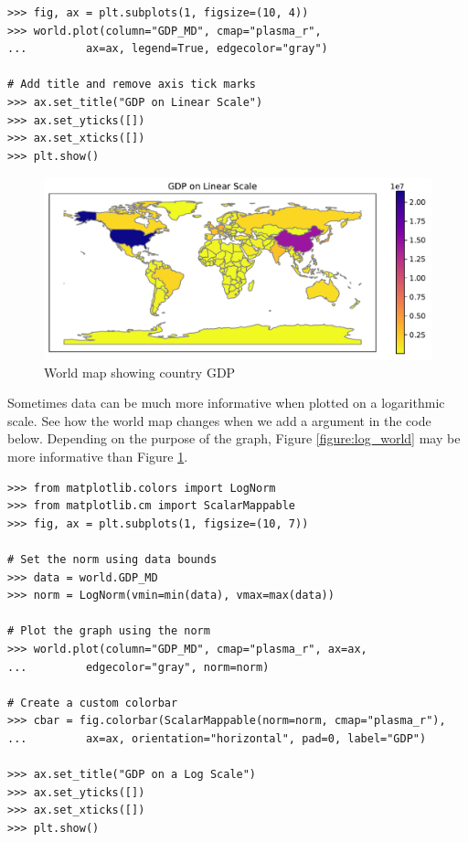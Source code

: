 \begin{lstlisting}
>>> fig, ax = plt.subplots(1, figsize=(10, 4))
>>> world.plot(column="GDP_MD", cmap="plasma_r",
...			ax=ax, legend=True, edgecolor="gray")

# Add title and remove axis tick marks
>>> ax.set_title("GDP on Linear Scale")
>>> ax.set_yticks([])
>>> ax.set_xticks([])
>>> plt.show()
\end{lstlisting}

\begin{figure}[H]
\begin{center}
\includegraphics[scale=.7]{figures/world_linear.pdf}
\end{center}
\caption{World map showing country GDP}
\label{figure:linear_world}
\end{figure}

Sometimes data can be much more informative when plotted on a logarithmic scale.
See how the world map changes when we add a  argument in the code below.
Depending on the purpose of the graph, Figure \ref{figure:log_world} may be more informative than Figure \ref{figure:linear_world}.

\begin{lstlisting}
>>> from matplotlib.colors import LogNorm
>>> from matplotlib.cm import ScalarMappable
>>> fig, ax = plt.subplots(1, figsize=(10, 7))

# Set the norm using data bounds
>>> data = world.GDP_MD
>>> norm = LogNorm(vmin=min(data), vmax=max(data))

# Plot the graph using the norm
>>> world.plot(column="GDP_MD", cmap="plasma_r", ax=ax,
...			edgecolor="gray", norm=norm)

# Create a custom colorbar
>>> cbar = fig.colorbar(ScalarMappable(norm=norm, cmap="plasma_r"),
...			ax=ax, orientation="horizontal", pad=0, label="GDP")

>>> ax.set_title("GDP on a Log Scale")
>>> ax.set_yticks([])
>>> ax.set_xticks([])
>>> plt.show()
\end{lstlisting}

